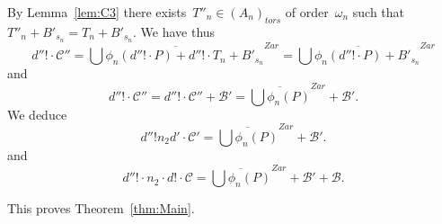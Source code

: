 \documentclass[12pt]{amsart}
\newtheorem{proposition}[theorem]{Proposition}
\newcommand{\Z}{{\mathbb Z}}
\newcommand{\Q}{{\mathbb Q}}
\newcommand{\ol}{\overline}
\begin{document}
By Lemma~\ref{lem:C3} there exists~$T''_n\in {(A_n)}_{tors}$ of order~$\omega_n$ such that
$T''_n+B'_{s_n}= T_n+B'_{s_n}$. We have thus
\[
d''!\cdot \mathcal{C}''=\ol{\bigcup \phi_n(d''!\cdot P)+ d''!\cdot T_n+B'_{s_n}}^{Zar}=\ol{\bigcup \phi_n(d''!\cdot P)+ B'_{s_n}}^{Zar}
\]
and
\[
d''!\cdot \mathcal{C}''=d''!\cdot \mathcal{C}''+ \mathcal{B'}=
\ol{\bigcup \phi_n(P)}^{Zar}+ \mathcal{B}'.
\]
We deduce
\[
d''!n_2d'\cdot 
\mathcal{C}'=
\ol{\bigcup \phi_n(P)}^{Zar}+ \mathcal{B}'.
\]
and
\[
d''!\cdot n_2\cdot d!\cdot 
\mathcal{C}=
\ol{\bigcup \phi_n(P)}^{Zar}+ \mathcal{B}'+ \mathcal{B}.
\]

This proves Theorem~\ref{thm:Main}.
%
%
\end{document}
